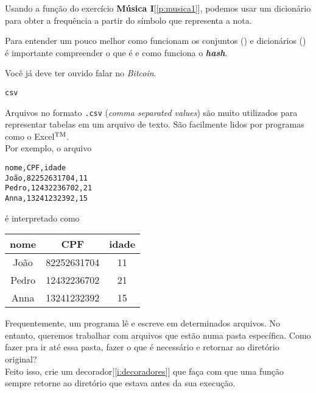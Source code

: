 \documentclass[12pt]{article}
\begin{document}
	
	\label{p:musica2}
	
	Usando a função do exercício \textbf{Música I}[\ref{p:musica1}], podemos usar um dicionário para obter a frequência a partir do símbolo que representa a nota.


	\begin{interlude}{}\label{i:hash}
		
	Para entender um pouco melhor como funcionam os conjuntos () e dicionários () é importante compreender o que é e como funciona o \textit{\textbf{hash}}.
	
	
	
	\end{interlude}	
	
	\label{p:blockchain}
	
	Você já deve ter ouvido falar no \textit{Bitcoin}.
	
	
	
	
	\begin{interlude}{\texttt{csv}}
	
	Arquivos no formato \texttt{.csv} (\textit{comma separated values}) são muito utilizados para representar tabelas em um arquivo de texto. São facilmente lidos por programas como o Excel$^{\tiny \text{TM}}$.\\
	
	Por exemplo, o arquivo
	
	\begin{lstlisting}
nome,CPF,idade
João,82252631704,11
Pedro,12432236702,21
Anna,13241232392,15
	\end{lstlisting}
	
	é interpretado como
	
	\begin{center}
	\begin{tabular}{|c|c|c|}
	\hline
	nome  & CPF         & idade\\
	\hline 
	João  & 82252631704 &11\\
	\hline
	Pedro & 12432236702 &21\\
	\hline
	Anna  & 13241232392 &15\\
	\hline
	\end{tabular}
	\end{center}
	
	\end{interlude}
	
	
	Frequentemente, um programa lê e escreve em determinados arquivos. No entanto, queremos trabalhar com arquivos que estão numa pasta específica. Como fazer pra ir até essa pasta, fazer o que é necessário e retornar ao diretório original?\\
	
	\quest Feito isso, crie um decorador[\ref{i:decoradores}] que faça com que uma função sempre retorne ao diretório que estava antes da sua execução.
	
\end{document}
